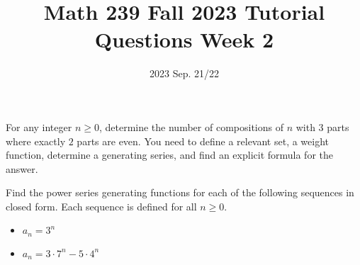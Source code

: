 \title{Math 239 Fall 2023 Tutorial Questions Week 2}

\date{2023 Sep. 21/22}
\maketitle

\begin{enumerate}
     For any integer $n \geq 0$, determine the number of compositions of $n$ 
    with $3$ parts where exactly $2$ parts are even.  You need to define 
    a relevant set, a weight function, determine a generating series, 
    and find an explicit formula for the answer.  

    
     Find the power series generating functions for each of the following sequences in closed form. Each sequence is defined for all $n \ge 0$.
    \begin{itemize}
        \item $a_n = 3^n$
        \item $a_n = 3 \cdot 7^n - 5 \cdot 4^n$
    \end{itemize}

   
    

\end{enumerate}

